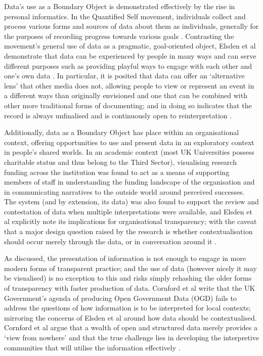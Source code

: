 Data's use as a Boundary Object is demonstrated effectively by the rise in personal informatics. In the Quantified Self movement, individuals collect and process various forms and sources of data about them as individuals, generally for the purposes of recording progress towards various goals \cite{swan_emerging_2009, swan_quantified_2013}. Contrasting the movement's general use of data as a pragmatic, goal-oriented object, Elsden et al demonstrate that data can be experienced by people in many ways and can serve different purposes such as providing playful ways to engage with each other and one's own data \cite{elsden_quantified_2014, elsden_metadating:_2016}. In particular, it is posited that data can offer an `alternative lens' that other media does not, allowing people to view or represent an event in a different ways than originally envisioned and one that can be combined with other more traditional forms of documenting; and in doing so indicates that the record is always unfinalised and is continuously open to reinterpretation \cite{elsden_designing_2017}.

Additionally, data as a Boundary Object has place within an organisational context, offering opportunities to use and present data in an exploratory context in people's shared worlds. In an academic context (most UK Universities possess charitable status and thus belong to the Third Sector), visualising research funding across the institution was found to act as a means of supporting members of staff in understanding the funding landscape of the organisation and in communicating narratives to the outside world around perceived successes. The system (and by extension, its data) was also found to support the review and contestation of data when multiple interpretations were available, and Elsden et al explicitly note its implications for organisational transparency; with the caveat that a major design question raised by the research is whether contextualisation should occur merely through the data, or in conversation around it \cite{elsden_resviz:_2016}.

As discussed, the presentation of information is not enough to engage in more modern forms of transparent practice; and the use of data (however nicely it may be visualised) is no exception to this and risks simply rehashing the older forms of transparency with faster production of data. Cornford et al write that the UK Government's agenda of producing Open Government Data (OGD) fails to address the questions of how information is to be interpreted for local contexts; mirroring the concerns of Elsden et al around how data should be contextualised. Cornford et al argue that a wealth of open and structured data merely provides a `view from nowhere' and that the true challenge lies in developing the interpretive communities that will utilise the information effectively \cite{cornford_local_2013}.

